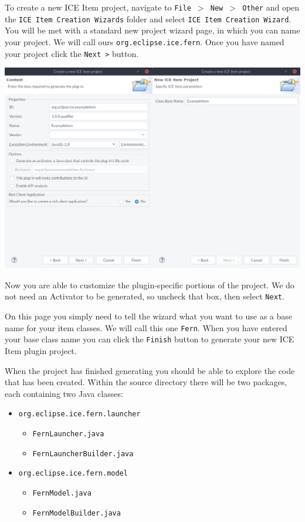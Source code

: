 \documentclass{article}
\begin{document}
To create a new ICE Item project, navigate to \texttt{File $>$ New $>$ Other}
and open the \texttt{ICE Item Creation Wizards} folder and 
select \texttt{ICE Item Creation Wizard}. You will be met with a standard new
project wizard page, in which you can name your project.  We will call ours
\texttt{org.eclipse.ice.fern}. Once you have named your project click the \texttt{Next >} button.
\begin{center} \includegraphics[width=\textwidth]{figures/comb23} \end{center}
Now you are able to customize the plugin-specific portions of the project. We do
not need an Activator to be generated, so uncheck that box, then select
\texttt{Next}. 

On this page you simply need to tell the wizard what you want to use as a base
name for your item classes.  We will call this one \texttt{Fern}. 
When you have entered your base class name you can
click the \texttt{Finish} button to generate your new ICE Item plugin project.

When the project has finished generating you should be able to explore the code
that has been created.  Within the source directory there will be two packages,
each containing two Java classes:

\begin{itemize} 
    \item \texttt{org.eclipse.ice.fern.launcher} 
    \begin{itemize}
        \item \texttt{FernLauncher.java} 
        \item \texttt{FernLauncherBuilder.java}
    \end{itemize} 
    \item \texttt{org.eclipse.ice.fern.model} 
    \begin{itemize} 
        \item \texttt{FernModel.java} 
        \item \texttt{FernModelBuilder.java}
    \end{itemize} 
\end{itemize}
\end{document}
